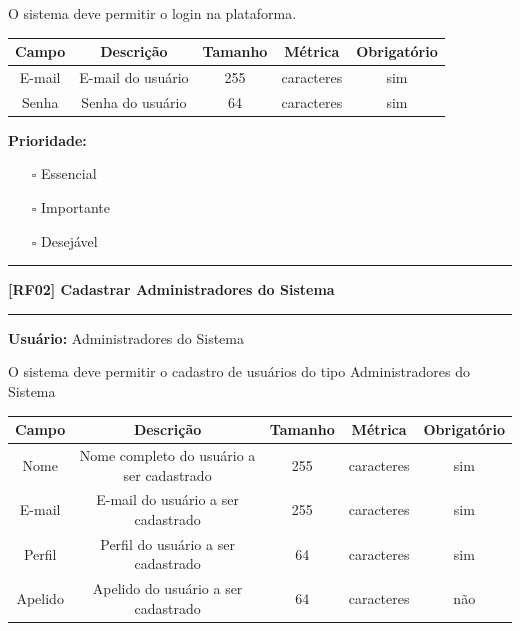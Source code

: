	O sistema deve permitir o login na plataforma.
	
	\begin{center}
		\begin{adjustbox}{width=\textwidth}      \begin{tabular}{ |c|c|c|c|c| } 
			\hline
			\rowcolor{lightgray} Campo & Descrição & Tamanho & Métrica & Obrigatório \\
			\hline
			E-mail & E-mail do usuário  & 255 & caracteres & sim \\ 
			\hline
			Senha & Senha do usuário & 64 & caracteres & sim \\
			\hline
		\end{tabular}    \end{adjustbox}
	\end{center}
	
	\textbf{Prioridade: }\begin{itemize}
		\item[\hspace{1cm}\rlap{\raisebox{0.2ex}{\hspace{0.4ex}\scriptsize \ding{56}}}$\square$]
		Essencial
		\item[\hspace{1cm}$\square$]
		Importante
		\item[\hspace{1cm}$\square$]
		Desejável
	\end{itemize}
	\begin{center}
		\noindent\rule{10cm}{0.4pt}
		\textbf{[RF02] Cadastrar Administradores do Sistema}
		\noindent\rule{10cm}{0.4pt}
	\end{center}
	\textbf{Usuário:} Administradores do Sistema
	
	O sistema deve permitir o cadastro de usuários do tipo Administradores do Sistema
	
	\begin{center}
		\begin{adjustbox}{width=\textwidth}      \begin{tabular}{ |c|c|c|c|c| } 
			\hline
			\rowcolor{lightgray} Campo & Descrição & Tamanho & Métrica & Obrigatório \\
			\hline
			Nome & Nome completo do usuário a ser cadastrado & 255 & caracteres & sim \\ 
			\hline
			E-mail & E-mail do usuário a ser cadastrado & 255 & caracteres & sim \\ 
			\hline
			Perfil & Perfil do usuário a ser cadastrado & 64 & caracteres & sim \\ 
			\hline
			Apelido & Apelido do usuário a ser cadastrado & 64 & caracteres & não \\
			\hline
		\end{tabular}    \end{adjustbox}
	\end{center}
	
